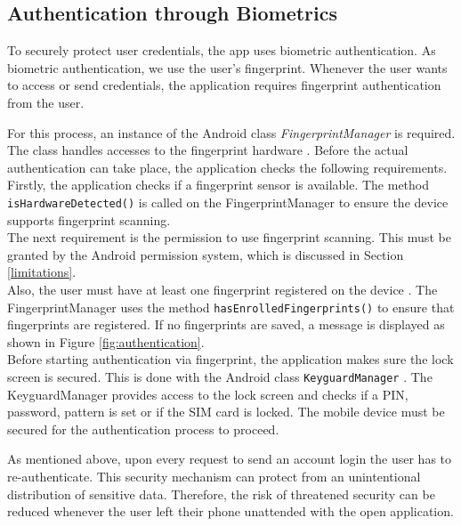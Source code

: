 
\subsection{Authentication through Biometrics}
To securely protect user credentials, the app uses biometric authentication. As biometric authentication, we use the user's fingerprint. Whenever the user wants to access or send credentials, the application requires fingerprint authentication from the user.

For this process, an instance of the Android class \textit{FingerprintManager} is required. The class handles accesses to the fingerprint hardware \cite{FingerprintManager}. Before the actual authentication can take place, the application checks the following requirements. \\
Firstly, the application checks if a fingerprint sensor is available. The method \texttt{isHardwareDetected()} is called on the FingerprintManager to ensure the device supports fingerprint scanning. \\
The next requirement is the permission to use fingerprint scanning. This must be granted by the Android permission system, which is discussed in Section \ref{limitations}. \\
Also, the user must have at least one fingerprint registered on the device \cite{FingerprintTutorial}. The FingerprintManager uses the method \texttt{hasEnrolledFingerprints()} to ensure that fingerprints are registered. If no fingerprints are saved, a message is displayed as shown in Figure \ref{fig:authentication}\protect{}. \\
Before starting authentication via fingerprint, the application makes sure the lock screen is secured. This is done with the Android class \texttt{KeyguardManager} \cite{KeyguardManager}. The KeyguardManager provides access to the lock screen and checks if a PIN, password, pattern is set or if the SIM card is locked. The mobile device must be secured for the authentication process to proceed.

As mentioned above, upon every request to send an account login the user has to re-authenticate. This security mechanism can protect from an unintentional distribution of sensitive data. Therefore, the risk of threatened security can be reduced whenever the user left their phone unattended with the open application. \\

